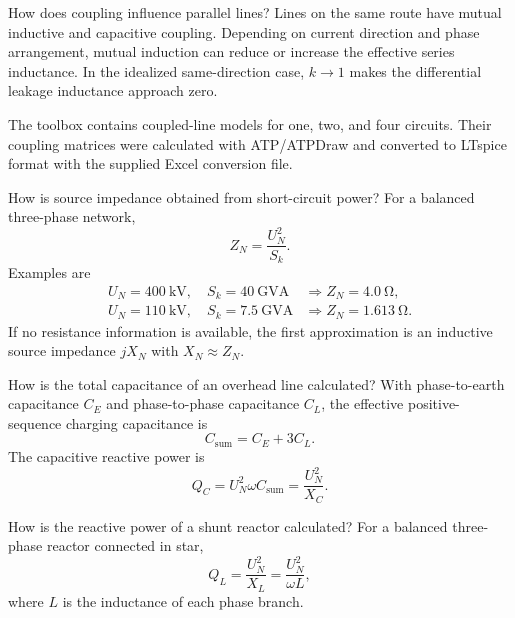 \begin{formulaBox}{How does coupling influence parallel lines?}
Lines on the same route have mutual inductive and capacitive coupling. Depending
on current direction and phase arrangement, mutual induction can reduce or
increase the effective series inductance. In the idealized same-direction case,
$k\rightarrow1$ makes the differential leakage inductance approach zero.

The toolbox contains coupled-line models for one, two, and four circuits. Their
coupling matrices were calculated with ATP/ATPDraw and converted to LTspice
format with the supplied Excel conversion file.
\end{formulaBox}

\begin{formulaBox}{How is source impedance obtained from short-circuit power?}
For a balanced three-phase network,
\begin{equation}
Z_N=\frac{U_N^2}{S_k}.
\end{equation}
Examples are
\begin{align}
U_N=\SI{400}{\kilo\volt},\quad S_k=\SI{40}{\giga\volt\ampere}
&\Rightarrow Z_N=\SI{4.0}{\ohm},\\
U_N=\SI{110}{\kilo\volt},\quad S_k=\SI{7.5}{\giga\volt\ampere}
&\Rightarrow Z_N=\SI{1.613}{\ohm}.
\end{align}
If no resistance information is available, the first approximation is an
inductive source impedance $jX_N$ with $X_N\approx Z_N$.
\end{formulaBox}

\begin{formulaBox}{How is the total capacitance of an overhead line calculated?}
With phase-to-earth capacitance $C_E$ and phase-to-phase capacitance $C_L$, the
effective positive-sequence charging capacitance is
\begin{equation}
C_{\mathrm{sum}}=C_E+3C_L.
\end{equation}
The capacitive reactive power is
\begin{equation}
Q_C=U_N^2\omega C_{\mathrm{sum}}
   =\frac{U_N^2}{X_C}.
\end{equation}
\end{formulaBox}

\begin{formulaBox}{How is the reactive power of a shunt reactor calculated?}
For a balanced three-phase reactor connected in star,
\begin{equation}
Q_L=\frac{U_N^2}{X_L}
   =\frac{U_N^2}{\omega L},
\end{equation}
where $L$ is the inductance of each phase branch.
\end{formulaBox}

